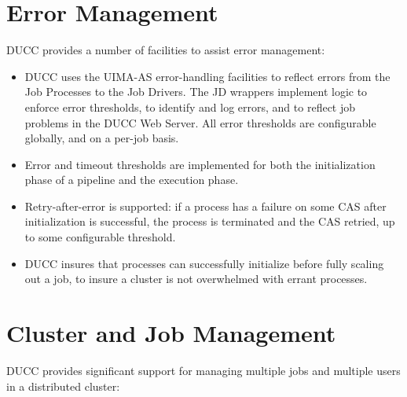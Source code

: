   
    \section{Error Management }
    DUCC provides a number of facilities to assist error management:
    
    \begin{itemize}
      \item DUCC uses the UIMA-AS error-handling facilities to reflect errors from the Job Processes
        to the Job Drivers. The JD wrappers implement logic to enforce error thresholds, to identify
        and log errors, and to reflect job problems in the DUCC Web Server.  All error thresholds are
        configurable globally, and on a per-job basis.

      \item Error and timeout thresholds are implemented for both the initialization phase of a pipeline
        and the execution phase.
    
      \item Retry-after-error is supported: if a process has a failure on some CAS after
        initialization is successful, the process is terminated and the CAS retried, up to some
        configurable threshold.

      \item DUCC insures that processes can successfully initialize before fully scaling out a job,
        to insure a cluster is not overwhelmed with errant processes.
      \end{itemize}
      
    \section{Cluster and Job Management}
    DUCC provides significant support for managing multiple jobs and multiple users in a distributed cluster:

